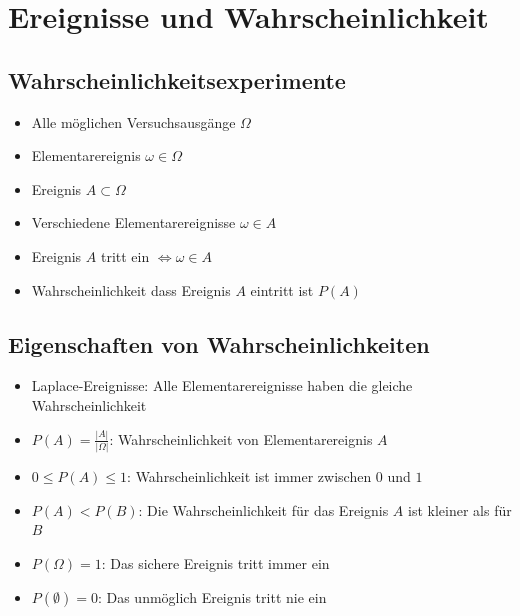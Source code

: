 \section{Ereignisse und Wahrscheinlichkeit}
\subsection{Wahrscheinlichkeitsexperimente}
\begin{itemize}
  \item Alle möglichen Versuchsausgänge $\Omega$
  \item Elementarereignis $\omega \in \Omega$
  \item Ereignis $A \subset \Omega$
  \item Verschiedene Elementarereignisse $\omega \in A$
  \item Ereignis $A$ tritt ein $\Leftrightarrow \omega \in A$
  \item Wahrscheinlichkeit dass Ereignis $A$ eintritt ist $P(A)$
\end{itemize}

\subsection{Eigenschaften von Wahrscheinlichkeiten}
\begin{itemize}
  \item Laplace-Ereignisse: Alle Elementarereignisse haben die gleiche
    Wahrscheinlichkeit
  \item $P(A) = \frac{|A|}{|\Omega|}$: Wahrscheinlichkeit von
    Elementarereignis $A$
  \item $0 \le P(A) \le 1$: Wahrscheinlichkeit ist immer zwischen $0$
    und $1$
  \item $P(A) < P(B)$: Die Wahrscheinlichkeit für das Ereignis $A$ ist
    kleiner als für $B$
  \item $P(\Omega) = 1$: Das sichere Ereignis tritt immer ein
  \item $P(\emptyset) = 0$: Das unmöglich Ereignis tritt nie ein
\end{itemize}

